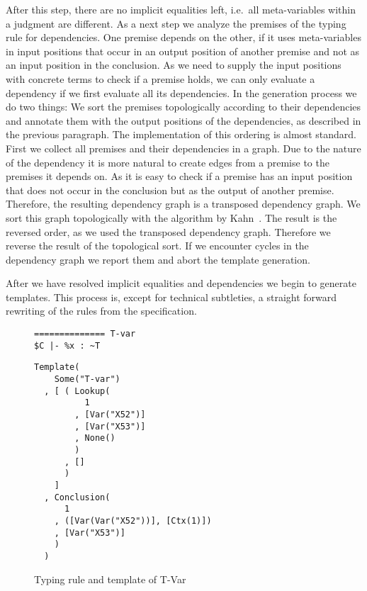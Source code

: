 After this step, there are no implicit equalities left, i.e.\ all
meta-variables within a judgment are different. As a next step we
analyze the premises of the typing rule for dependencies. One premise
depends on the other, if it uses meta-variables in input positions
that occur in an output position of another premise and not as an
input position in the conclusion. As we need to supply the input
positions with concrete terms to check if a premise holds, we can only
evaluate a dependency if we first evaluate all its dependencies. In
the generation process we do two things: We sort the premises
topologically according to their dependencies and annotate them with
the output positions of the dependencies, as described in the previous
paragraph. The implementation of this ordering is almost
standard. First we collect all premises and their dependencies in a
graph. Due to the nature of the dependency it is more natural to
create edges from a premise to the premises it depends on. As it is
easy to check if a premise has an input position that does not occur
in the conclusion but as the output of another premise. Therefore, the
resulting dependency graph is a transposed dependency graph. We sort
this graph topologically with the algorithm by
Kahn~\cite{Kahn:1962:TSL:368996.369025}. The result is the reversed
order, as we used the transposed dependency graph. Therefore we
reverse the result of the topological sort. If we encounter cycles in
the dependency graph we report them and abort the template generation.

After we have resolved implicit equalities and dependencies we begin
to generate templates. This process is, except for technical
subtleties, a straight forward rewriting of the rules from the
specification.

\begin{figure}
  \centering
  \begin{minipage}{.35\linewidth}
\begin{lstlisting}[language=sltc]
%x : ~T in $C
============== T-var
$C |- %x : ~T
\end{lstlisting}
  \end{minipage}
  \begin{minipage}{.55\linewidth}
\begin{lstlisting}[language=sltc]
Template(
    Some("T-var")
  , [ ( Lookup(
          1
        , [Var("X52")]
        , [Var("X53")]
        , None()
        )
      , []
      )
    ]
  , Conclusion(
      1
    , ([Var(Var("X52"))], [Ctx(1)])
    , [Var("X53")]
    )
  )
\end{lstlisting}
  \end{minipage}
  \caption{Typing rule and template of T-Var}
  \label{fig:template-example}
\end{figure}
